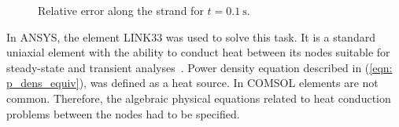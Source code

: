 \begin{figure}[h!]
\centering
    \caption{Relative error along the strand for $t=0.1~\text{s}$.}
    \label{fig: ans_comsol_comparison_f_2_2}
\end{figure}

In ANSYS, the element LINK33 was used to solve this task. It is a standard uniaxial element with the ability to conduct heat between its nodes suitable for steady-state and transient analyses~\cite{ansys_element_manual}. Power density equation described in (\ref{eqn: p_dens_equiv}), was defined as a heat source. In COMSOL elements are not common. Therefore, the algebraic physical equations related to heat conduction problems between the nodes had to be specified.
